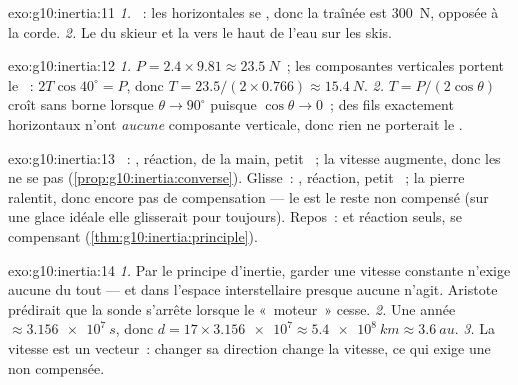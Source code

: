 \begin{solution}{exo:g10:inertia:11}
\emph{1.} ~: les
 horizontales se ,
donc la traînée est \qty{300}{N}, opposée à la corde. \emph{2.} Le
 du skieur et la  vers le haut de l'eau sur
les skis.
\end{solution}

\begin{solution}{exo:g10:inertia:12}
\emph{1.} $P = 2.4 \times 9.81 \approx \qty{23.5}{N}$~; les
composantes verticales portent le ~:
$2T\cos 40^\circ = P$, donc
$T = 23.5/(2 \times 0.766) \approx \qty{15.4}{N}$. \emph{2.}
$T = P/(2\cos\theta)$ croît sans borne lorsque $\theta \to 90^\circ$
puisque $\cos\theta \to 0$~; des fils exactement horizontaux n'ont
\emph{aucune} composante verticale, donc rien ne porterait le
.
\end{solution}

\begin{solution}{exo:g10:inertia:13}
~: , réaction,  de la
main, petit ~; la vitesse augmente, donc les
 ne se  pas
(\cref{prop:g10:inertia:converse}). Glisse~: ,
réaction, petit ~; la pierre ralentit, donc
encore pas de compensation --- le  est le reste non
compensé (sur une glace idéale elle glisserait pour toujours). Repos~:
 et réaction seuls, se compensant
(\cref{thm:g10:inertia:principle}).
\end{solution}

\begin{solution}{exo:g10:inertia:14}
\emph{1.} Par le principe d'inertie, garder une vitesse constante
n'exige aucune  du tout --- et dans l'espace
interstellaire presque aucune n'agit. Aristote prédirait que la sonde
s'arrête lorsque le «~moteur~» cesse. \emph{2.} Une année
$\approx \qty{3.156e7}{s}$, donc
$d = 17 \times \num{3.156e7} \approx \qty{5.4e8}{km} \approx
\qty{3.6}{au}$. \emph{3.} La vitesse est un vecteur~: changer sa
direction change la vitesse, ce qui exige une  non
compensée.
\end{solution}

